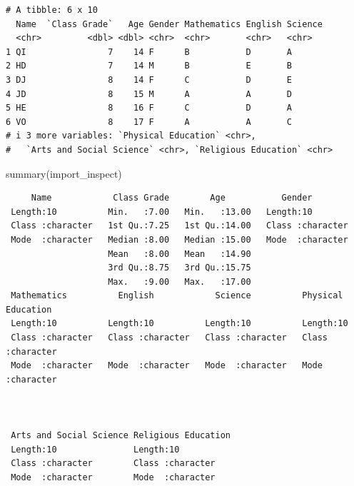 \documentclass[
  letterpaper,
  DIV=11,
  numbers=noendperiod]{scrreprt}
\newenvironment{Shaded}{\begin{snugshade}}{\end{snugshade}}
\newcommand{\FunctionTok}[1]{\textcolor[rgb]{0.28,0.35,0.67}{#1}}
\newcommand{\NormalTok}[1]{\textcolor[rgb]{0.00,0.23,0.31}{#1}}
\begin{document}
\begin{verbatim}
# A tibble: 6 x 10
  Name  `Class Grade`   Age Gender Mathematics English Science
  <chr>         <dbl> <dbl> <chr>  <chr>       <chr>   <chr>  
1 QI                7    14 F      B           D       A      
2 HD                7    14 M      B           E       B      
3 DJ                8    14 F      C           D       E      
4 JD                8    15 M      A           A       D      
5 HE                8    16 F      C           D       A      
6 VO                8    17 F      A           A       C      
# i 3 more variables: `Physical Education` <chr>,
#   `Arts and Social Science` <chr>, `Religious Education` <chr>
\end{verbatim}

\begin{Shaded}
\begin{Highlighting}[]
\FunctionTok{summary}\NormalTok{(import\_inspect)}
\end{Highlighting}
\end{Shaded}

\begin{verbatim}
     Name            Class Grade        Age           Gender         
 Length:10          Min.   :7.00   Min.   :13.00   Length:10         
 Class :character   1st Qu.:7.25   1st Qu.:14.00   Class :character  
 Mode  :character   Median :8.00   Median :15.00   Mode  :character  
                    Mean   :8.00   Mean   :14.90                     
                    3rd Qu.:8.75   3rd Qu.:15.75                     
                    Max.   :9.00   Max.   :17.00                     
 Mathematics          English            Science          Physical Education
 Length:10          Length:10          Length:10          Length:10         
 Class :character   Class :character   Class :character   Class :character  
 Mode  :character   Mode  :character   Mode  :character   Mode  :character  
                                                                            
                                                                            
                                                                            
 Arts and Social Science Religious Education
 Length:10               Length:10          
 Class :character        Class :character   
 Mode  :character        Mode  :character   
                                            
                                            
                                            
\end{verbatim}
\end{document}
